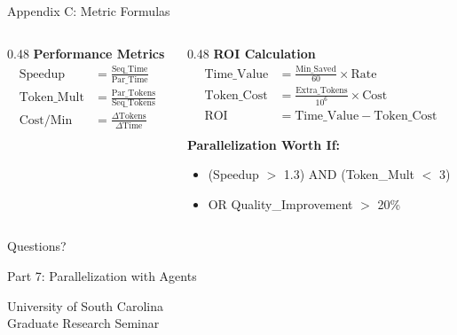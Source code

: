 \documentclass[aspectratio=169,11pt]{beamer}
\begin{document}
\begin{frame}{Appendix C: Metric Formulas}
    \begin{columns}[T]
        \begin{column}{0.48\textwidth}
            \textbf{Performance Metrics}
            \begin{align*}
                \text{Speedup} &= \frac{\text{Seq\_Time}}{\text{Par\_Time}} \\[0.5em]
                \text{Token\_Mult} &= \frac{\text{Par\_Tokens}}{\text{Seq\_Tokens}} \\[0.5em]
                \text{Cost/Min} &= \frac{\Delta\text{Tokens}}{\Delta\text{Time}}
            \end{align*}
        \end{column}
        \begin{column}{0.48\textwidth}
            \textbf{ROI Calculation}
            \begin{align*}
                \text{Time\_Value} &= \frac{\text{Min\_Saved}}{60} \times \text{Rate} \\[0.5em]
                \text{Token\_Cost} &= \frac{\text{Extra\_Tokens}}{10^6} \times \text{Cost} \\[0.5em]
                \text{ROI} &= \text{Time\_Value} - \text{Token\_Cost}
            \end{align*}

            \vspace{0.3cm}
            \textbf{Parallelization Worth If:}
            \begin{itemize}
                \footnotesize
                \item (Speedup $>$ 1.3) AND (Token\_Mult $<$ 3)
                \item OR Quality\_Improvement $>$ 20\%
            \end{itemize}
        \end{column}
    \end{columns}
\end{frame}

\begin{frame}
    \begin{center}
        \Huge\textcolor{UofSCGarnet}{Questions?}

        \vspace{1cm}

        \Large Part 7: Parallelization with Agents

        \vspace{0.5cm}

        \normalsize
        University of South Carolina\\
        Graduate Research Seminar
    \end{center}
\end{frame}
\end{document}
